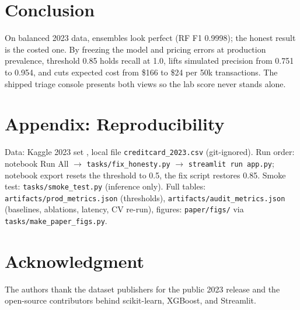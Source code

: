 \documentclass[conference]{IEEEtran}
\begin{document}
\section{Conclusion}
On balanced 2023 data, ensembles look perfect (RF F1 0.9998); the
honest result is the costed one. By freezing the model and pricing
errors at production prevalence, threshold 0.85 holds recall at 1.0,
lifts simulated precision from 0.751 to 0.954, and cuts expected cost
from \$166 to \$24 per 50k transactions. The shipped triage console
presents both views so the lab score never stands alone.

\appendix
\section*{Appendix: Reproducibility}
Data: Kaggle 2023 set \cite{kaggle2023}, local file
\texttt{creditcard\_2023.csv} (git-ignored). Run order: notebook Run
All $\to$ \texttt{tasks/fix\_honesty.py} $\to$ \texttt{streamlit run
app.py}; notebook export resets the threshold to 0.5, the fix script
restores 0.85. Smoke test: \texttt{tasks/smoke\_test.py} (inference
only). Full tables: \texttt{artifacts/prod\_metrics.json} (thresholds),
\texttt{artifacts/audit\_metrics.json} (baselines, ablations, latency,
CV re-run), figures: \texttt{paper/figs/} via
\texttt{tasks/make\_paper\_figs.py}.

\section*{Acknowledgment}
The authors thank the dataset publishers for the public 2023 release
and the open-source contributors behind scikit-learn, XGBoost, and
Streamlit.
\end{document}
